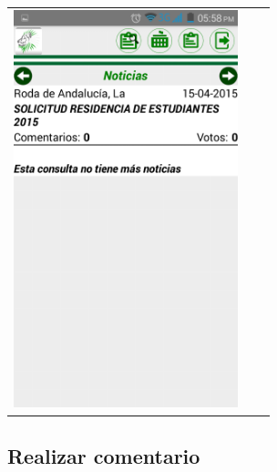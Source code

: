 \begin{tabular}{p{7cm}p{8mm}p{7cm}}
\\
\includegraphics[width=6.5cm]{./android/imagenes/bus3.png}


\\

\end{tabular}
%
%
%
%
%


\subsection{Realizar comentario}

